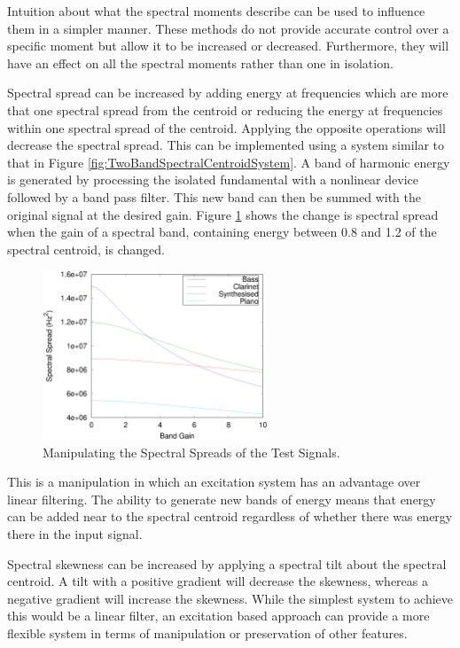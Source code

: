 			Intuition about what the spectral moments describe can be used to influence them in a simpler
			manner. These methods do not provide accurate control over a specific moment but allow it to be
			increased or decreased.  Furthermore, they will have an effect on all the spectral moments rather
			than one in isolation. 
			
			Spectral spread can be increased by adding energy at frequencies which are more that one spectral
			spread from the centroid or reducing the energy at frequencies within one spectral spread of the
			centroid.  Applying the opposite operations will decrease the spectral spread. This can be
			implemented using a system similar to that in Figure \ref{fig:TwoBandSpectralCentroidSystem}. A
			band of harmonic energy is generated by processing the isolated fundamental with a nonlinear device
			followed by a band pass filter. This new band can then be summed with the original signal at the
			desired gain. Figure \ref{fig:MoveSpreads} shows the change is spectral spread when the gain of a
			spectral band, containing energy between 0.8 and 1.2 of the spectral centroid, is changed.

			\begin{figure}[h!]
				\centering
				\includegraphics[width=0.6\textwidth]{chapter6/Images/MoveSpreads.eps}
				\caption{Manipulating the Spectral Spreads of the Test Signals.}
				\label{fig:MoveSpreads}
			\end{figure}

			This is a manipulation in which an excitation system has an advantage over linear filtering. The
			ability to generate new bands of energy means that energy can be added near to the spectral
			centroid regardless of whether there was energy there in the input signal.

			Spectral skewness can be increased by applying a spectral tilt about the spectral centroid. A tilt
			with a positive gradient will decrease the skewness, whereas a negative gradient will increase the
			skewness. While the simplest system to achieve this would be a linear filter, an excitation based
			approach can provide a more flexible system in terms of manipulation or preservation of other
			features.


